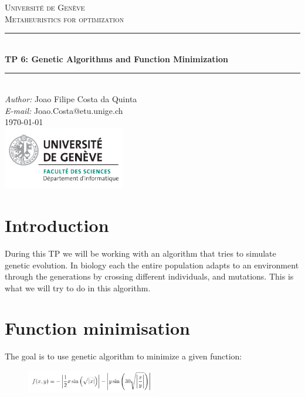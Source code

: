 \documentclass[a4paper]{article}
\makeatletter
\newcommand\TPid{6}
\newcommand\TPname{Genetic Algorithms and Function Minimization}
\newcommand\Firstname{Joao Filipe}
\newcommand\Familyname{Costa da Quinta}
\newcommand\Email{Joao.Costa@etu.unige.ch}
\makeatother
\begin{document}
\begin{titlepage}

\newcommand{\HRule}{\rule{\linewidth}{0.5mm}} 							%

\center 
 
\textsc{\LARGE Université de Genève}\\[1cm]

\textsc{\Large Metaheuristics for optimization}\\[0.2cm]									%
\HRule \\[0.8cm]
{ \huge \bfseries TP \TPid : \TPname}\\[0.7cm]								%
\HRule \\[2cm]
\large
\emph{Author:} \Firstname \; \Familyname\\[0.5cm]		
\emph{E-mail:} {\color{blue}\Email}\\[7cm]		
{\large \today}\\[2cm]
\includegraphics[width=0.4\textwidth]{images/unige_csd.png}\\[1cm] 	%
\vfill 
\end{titlepage}


\newpage
\section{Introduction}
During this TP we will be working with an algorithm that tries to simulate genetic evolution. In biology each the entire population adapts to an environment through the generations by crossing different individuals, and mutations. This is what we will try to do in this algorithm. 

\section{Function minimisation}
The goal is to use genetic algorithm to minimize a given function:
\begin{figure}[H]
\center
\includegraphics[width=0.5\textwidth]{images/f.PNG}
\end{figure}
\end{document}
